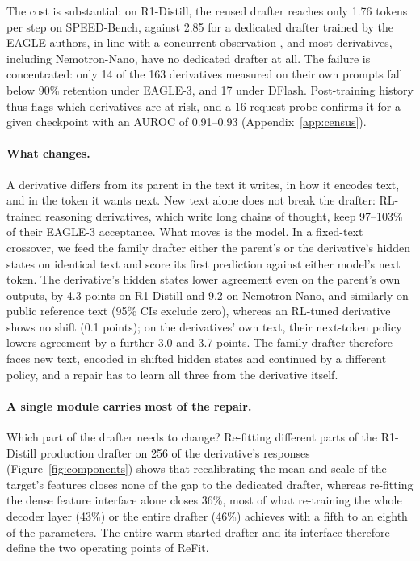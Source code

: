 \documentclass[11pt]{article}
\newcommand{\refit}{ReFit}
\begin{document}
The cost is substantial: on R1-Distill, the reused drafter reaches only 1.76 tokens per step on SPEED-Bench, against 2.85 for a dedicated drafter trained by the EAGLE authors, in line with a concurrent observation \citep{jiang2026hspec}, and most derivatives, including Nemotron-Nano, have no dedicated drafter at all.
The failure is concentrated: only 14 of the 163 derivatives measured on their own prompts fall below 90\% retention under EAGLE-3, and 17 under DFlash.
Post-training history thus flags which derivatives are at risk, and a 16-request probe confirms it for a given checkpoint with an AUROC of 0.91--0.93 (Appendix~\ref{app:census}).

\paragraph{What changes.}
A derivative differs from its parent in the text it writes, in how it encodes text, and in the token it wants next.
New text alone does not break the drafter: RL-trained reasoning derivatives, which write long chains of thought, keep 97--103\% of their EAGLE-3 acceptance.
What moves is the model.
In a fixed-text crossover, we feed the family drafter either the parent's or the derivative's hidden states on identical text and score its first prediction against either model's next token.
The derivative's hidden states lower agreement even on the parent's own outputs, by 4.3 points on R1-Distill and 9.2 on Nemotron-Nano, and similarly on public reference text (95\% CIs exclude zero), whereas an RL-tuned derivative shows no shift (0.1 points); on the derivatives' own text, their next-token policy lowers agreement by a further 3.0 and 3.7 points.
The family drafter therefore faces new text, encoded in shifted hidden states and continued by a different policy, and a repair has to learn all three from the derivative itself.

\paragraph{A single module carries most of the repair.}
Which part of the drafter needs to change?
Re-fitting different parts of the R1-Distill production drafter on 256 of the derivative's responses (Figure~\ref{fig:components}) shows that recalibrating the mean and scale of the target's features closes none of the gap to the dedicated drafter, whereas re-fitting the dense feature interface alone closes 36\%, most of what re-training the whole decoder layer (43\%) or the entire drafter (46\%) achieves with a fifth to an eighth of the parameters.
The entire warm-started drafter and its interface therefore define the two operating points of \refit{}.
\end{document}
